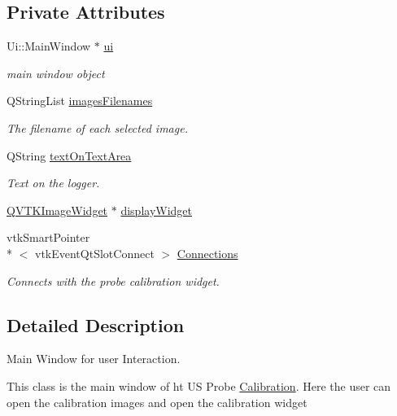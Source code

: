 \subsection*{Private Attributes}
\begin{DoxyCompactItemize}
\item 
Ui\-::\-Main\-Window $\ast$ \hyperlink{class_main_window_a35466a70ed47252a0191168126a352a5}{ui}
\begin{DoxyCompactList}\small\item\em main window object \end{DoxyCompactList}\item 
Q\-String\-List \hyperlink{class_main_window_a8b33f17919e8e99127a612476aefdaed}{images\-Filenames}
\begin{DoxyCompactList}\small\item\em The filename of each selected image. \end{DoxyCompactList}\item 
Q\-String \hyperlink{class_main_window_aac7c4f4184a77a56eef59fff591c9521}{text\-On\-Text\-Area}
\begin{DoxyCompactList}\small\item\em Text on the logger. \end{DoxyCompactList}\item 
\hyperlink{class_q_v_t_k_image_widget}{Q\-V\-T\-K\-Image\-Widget} $\ast$ \hyperlink{class_main_window_a79daf435968c77e526ddf286bcc86a8f}{display\-Widget}
\item 
vtk\-Smart\-Pointer\\*
$<$ vtk\-Event\-Qt\-Slot\-Connect $>$ \hyperlink{class_main_window_a2581229148c6c597849b827689e58a12}{Connections}
\begin{DoxyCompactList}\small\item\em Connects with the probe calibration widget. \end{DoxyCompactList}\end{DoxyCompactItemize}


\subsection{Detailed Description}
Main Window for user Interaction. 

This class is the main window of ht U\-S Probe \hyperlink{class_calibration}{Calibration}. Here the user can open the calibration images and open the calibration widget 

